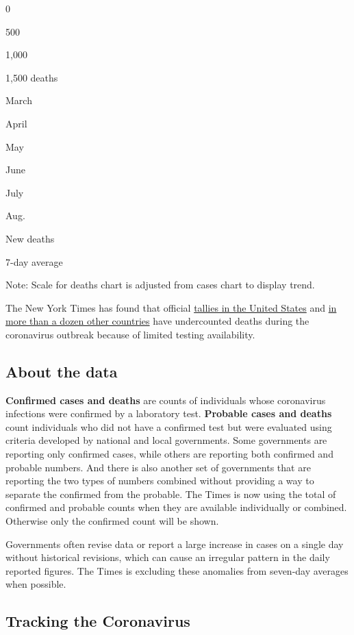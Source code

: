 0

500

1,000

1,500 deaths

March

April

May

June

July

Aug.

New deaths

7-day average

Note: Scale for deaths chart is adjusted from cases chart to display
trend.

The New York Times has found that official
\href{https://www.nytimes.com/interactive/2020/04/28/us/coronavirus-death-toll-total.html}{tallies
in the United States} and
\href{https://www.nytimes.com/interactive/2020/04/21/world/coronavirus-missing-deaths.html}{in
more than a dozen other countries} have undercounted deaths during the
coronavirus outbreak because of limited testing availability.

\hypertarget{about-the-data}{%
\subsection{About the data}\label{about-the-data}}

\textbf{Confirmed cases and deaths} are counts of individuals whose
coronavirus infections were confirmed by a laboratory test.
\textbf{Probable cases and deaths} count individuals who did not have a
confirmed test but were evaluated using criteria developed by national
and local governments. Some governments are reporting only confirmed
cases, while others are reporting both confirmed and probable numbers.
And there is also another set of governments that are reporting the two
types of numbers combined without providing a way to separate the
confirmed from the probable. The Times is now using the total of
confirmed and probable counts when they are available individually or
combined. Otherwise only the confirmed count will be shown.

Governments often revise data or report a large increase in cases on a
single day without historical revisions, which can cause an irregular
pattern in the daily reported figures. The Times is excluding these
anomalies from seven-day averages when possible.

\hypertarget{tracking-the-coronavirus}{%
\subsection{Tracking the Coronavirus}\label{tracking-the-coronavirus}}

